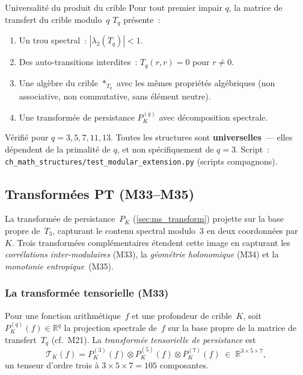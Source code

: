 \documentclass[12pt,a4paper]{article}
\begin{document}
\begin{thmbox}{Universalité du produit du crible}
\label{thm:universality}
Pour tout premier impair $q$, la matrice de transfert du crible
modulo~$q$ $T_q$ présente~:
\begin{enumerate}[nosep]
\item Un trou spectral~: $|\lambda_2(T_q)| < 1$.
\item Des auto-transitions interdites~: $T_q(r, r) = 0$ pour $r \neq 0$.
\item Une algèbre du crible $*_{T_q}$ avec les mêmes propriétés
  algébriques (non associative, non commutative, sans élément neutre).
\item Une transformée de persistance $P_K^{(q)}$ avec décomposition
  spectrale.
\end{enumerate}
Vérifié pour $q = 3, 5, 7, 11, 13$. Toutes les structures sont
\textbf{universelles}~--- elles dépendent de la primalité de $q$, et
non spécifiquement de $q = 3$.
Script~: \texttt{ch\_math\_structures/test\_modular\_extension.py}
(scripts compagnons).
\end{thmbox}


\subsection{Transformées PT (M33--M35)}
\label{sec:ms_new_transforms}

La transformée de persistance~$P_K$ (\cref{sec:ms_transform}) projette
sur la base propre de~$T_3$, capturant le contenu spectral modulo~3
en deux coordonnées par~$K$. Trois transformées complémentaires
étendent cette image en capturant les \emph{corrélations
inter-modulaires} (M33), la \emph{géométrie holonomique} (M34) et la
\emph{monotonie entropique}~(M35).


\subsubsection{La transformée tensorielle (M33)}
\label{sec:ms_tensor_transform}

\begin{definition}
\label{def:tensor_transform}
Pour une fonction arithmétique~$f$ et une profondeur de crible~$K$,
soit $P_K^{(q)}(f) \in \mathbb{R}^q$ la projection spectrale de~$f$
sur la base propre de la matrice de transfert~$T_q$ (cf.~M21). La
\emph{transformée tensorielle de persistance} est
\begin{equation}
  \mathcal{T}_K(f)
  = P_K^{(3)}(f) \otimes P_K^{(5)}(f) \otimes P_K^{(7)}(f)
  \;\in\; \mathbb{R}^{3 \times 5 \times 7},
  \label{eq:tensor_transform}
\end{equation}
un tenseur d'ordre trois à $3 \times 5 \times 7 = 105$ composantes.
\end{definition}
\end{document}
